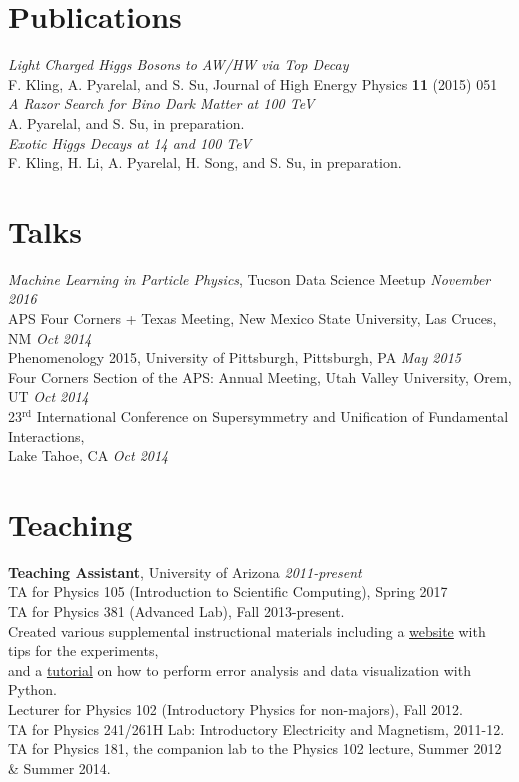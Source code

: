 \documentclass[final,oneside,10pt]{memoir}
\begin{document}
\section*{Publications}

  \emph{Light Charged Higgs Bosons to AW/HW via Top Decay}\\
F. Kling, A. Pyarelal, and S. Su, Journal of High Energy Physics \textbf{11} (2015) 051\\
  \emph{A Razor Search for Bino Dark Matter at 100 TeV}\\
A. Pyarelal, and S. Su, in preparation.\\
  \emph{Exotic Higgs Decays at 14 and 100 TeV}\\
F. Kling, H. Li, A. Pyarelal, H. Song, and S. Su, in preparation.
\section*{Talks}
  \emph{Machine Learning in Particle Physics}, Tucson Data Science Meetup
\hfill \textit{ November 2016}\\
  APS Four Corners + Texas Meeting, New Mexico State University, Las Cruces, NM
\hfill \textit{ Oct 2014}\\
  Phenomenology 2015, University of Pittsburgh, Pittsburgh, PA
\hfill \textit{ May 2015}\\
  Four Corners Section of the APS: Annual Meeting, Utah Valley University, Orem, UT
\hfill \textit{ Oct 2014}\\
  23$^{\text{rd}}$ International Conference on Supersymmetry and Unification of Fundamental Interactions,\\ 
Lake Tahoe, CA 
\hfill \textit{ Oct 2014}\\
\section*{Teaching}
\textsf{\textbf{Teaching Assistant}}, \textsf{ University of Arizona}\hfill\textit{ 2011-present}\\
  TA for Physics 105 (Introduction to Scientific Computing), Spring 2017\\
  TA for Physics 381 (Advanced Lab), Fall 2013-present.\\
\indent Created various supplemental instructional materials including a \href{http://www.physics.arizona.edu/~adarsh/teaching/phys381}{website} with tips for the experiments,\\  
\indent and a \href{http://www.physics.arizona.edu/~adarsh/teaching/phys381/Error\_Analysis\_Notebook/index.html}{tutorial} on how to perform error analysis and data visualization with Python.\\
  Lecturer for Physics 102 (Introductory Physics for non-majors), Fall 2012.\\
 TA for Physics 241/261H Lab: Introductory Electricity and Magnetism, 2011-12.\\
 TA for Physics 181, the companion lab to the Physics 102 lecture, Summer 2012 \& Summer 2014.\\
\end{document}
